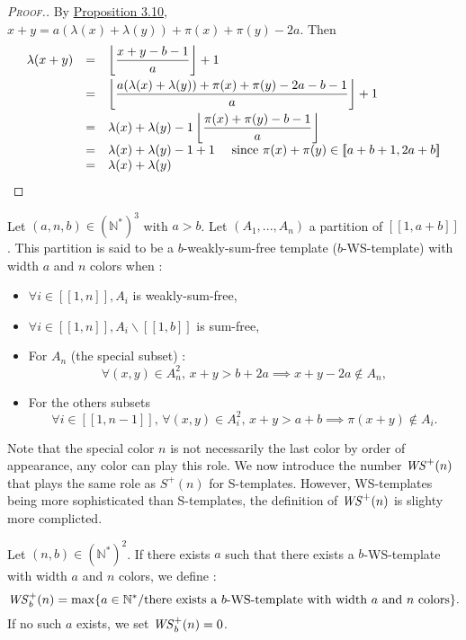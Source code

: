 \begin{proof}[\textsc{Proof.}]
By \hyperref[prop5]{Proposition 3.10}, \(x + y = a (\lambda(x) + \lambda(y)) + \pi(x) + \pi(y) - 2 a\). Then
\[
\begin{array}{l l l}
	\lambda(x + y) & = & \left \lfloor \dfrac{x + y - b - 1}{a} \right \rfloor + 1 \vspace{1mm} \\
	 & = & \left \lfloor \dfrac{a (\lambda(x) + \lambda(y)) + \pi(x) + \pi(y) - 2 a - b - 1}{a} \right \rfloor + 1 \vspace{1mm} \\
	 & = & \lambda(x) + \lambda(y) - 1 \left \lfloor \dfrac{\pi(x) + \pi(y) - b - 1}{a}\right\rfloor \\
	 & = & \lambda(x)+\lambda(y) -1 +1 ~~~~\text{since } \pi(x) + \pi(y) \in [\![a + b + 1, 2 a + b]\!] \\
	 & =& \lambda(x)+\lambda(y)
\end{array}
\]
\end{proof}

\begin{definition}
Let \( (a,n,b) \in (\mathbb{N}^*)^3\) with \(a > b\). Let \((A_1,...,A_n)\) a partition of  \([\![1, a + b]\!]\).
This partition is said to be a \(b\)-weakly-sum-free template (\(b\)-WS-template) with width \(a\) and \(n\) colors when :

\begin{itemize}
\item \(\forall i \in [\![1, n]\!], A_i\) is weakly-sum-free,
\item \(\forall i \in [\![1, n]\!], A_i\backslash [\![1, b]\!]\) is sum-free,
\item For \(A_n\) (the special subset) :
	\[
	\forall (x,y) \in A_n^2, \,x+y>b+2a \implies x+y-2a\notin A_n,
	\]
\item For the others subsets
	\[
	\forall i \in [\![1,n-1]\!], \, \forall(x,y) \in A_i^2, \, x+y>a+b \implies \pi(x+y) \notin A_i.
	\]
\end{itemize}
\end{definition}

Note that the special color \(n\) is not necessarily the last color by order of appearance, any color can play this role.
We now introduce the number \(\mathit{WS}^+(n)\) that plays the same role as \(S^+(n)\) for S-templates.
However, WS-templates being more sophisticated than S-templates, the definition of \(\mathit{WS}^+(n)\)
is slighty more complicted.

\begin{definition}
Let \( (n,b) \in (\mathbb{N}^*)^2\). If there exists \(a\) such that there exists a \(b\)-WS-template with width \(a\)
and \(n\) colors, we define :
\[
\mathit{WS}_b^+(n)= \max \{a \in \mathbb{N}^*/ \text{there exists a } b \text{-WS-template with width } a \text{ and } n \text{ colors} \}.
\]
If no such \(a\) exists, we set \(\mathit{WS}_b^+(n) = 0\).
\end{definition}

